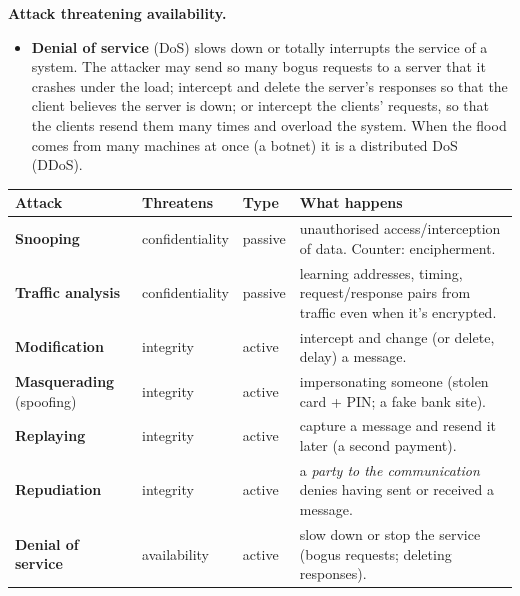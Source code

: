 \textbf{Attack threatening availability.}
\begin{itemize}[leftmargin=1.4em]
  \item \textbf{Denial of service} (DoS) slows down or totally interrupts the service of a system. The attacker may send so many bogus requests to a server that it crashes under the load; intercept and delete the server's responses so that the client believes the server is down; or intercept the clients' requests, so that the clients resend them many times and overload the system. When the flood comes from many machines at once (a botnet) it is a distributed DoS (DDoS).
\end{itemize}
\begin{center}\small
\begin{tabularx}{\textwidth}{@{}l l l X@{}}
\toprule
Attack & Threatens & Type & What happens\\
\midrule
\textbf{Snooping} & confidentiality & passive & unauthorised access/interception of data. Counter: encipherment.\\
\textbf{Traffic analysis} & confidentiality & passive & learning addresses, timing, request/response pairs from traffic even when it's encrypted.\\
\textbf{Modification} & integrity & active & intercept and change (or delete, delay) a message.\\
\textbf{Masquerading} (spoofing) & integrity & active & impersonating someone (stolen card + PIN; a fake bank site).\\
\textbf{Replaying} & integrity & active & capture a message and resend it later (a second payment).\\
\textbf{Repudiation} & integrity & active & a \emph{party to the communication} denies having sent or received a message.\\
\textbf{Denial of service} & availability & active & slow down or stop the service (bogus requests; deleting responses).\\
\bottomrule
\end{tabularx}
\end{center}

